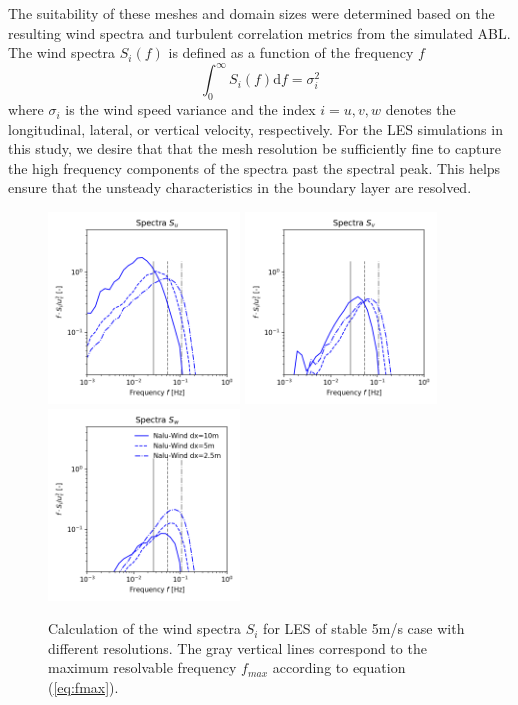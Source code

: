 The suitability of these meshes and domain sizes were determined based
on the resulting wind spectra and turbulent correlation metrics from
the simulated ABL. The wind spectra $S_i(f)$ is defined as a function
of the frequency $f$
\begin{equation}
  \int_0^\infty S_i(f) \textrm{d}f = \sigma_i^2
\end{equation}
where $\sigma_i$ is the wind speed variance and the index $i=u,v,w$
denotes the longitudinal, lateral, or vertical velocity, respectively.
For the LES simulations in this study, we desire that that the mesh
resolution be sufficiently fine to capture the high frequency
components of the spectra past the spectral peak.  This helps ensure
that the unsteady characteristics in the boundary layer are resolved.


\begin{figure}%
  \centering
  \includegraphics[width=2.0in]{figures/GridStudy_Spectra_Su.png}
  \includegraphics[width=2.0in]{figures/GridStudy_Spectra_Sv.png}
  \includegraphics[width=2.0in]{figures/GridStudy_Spectra_Sw.png}
  \caption{   \label{fig:GridStudySpectra}
    Calculation of the wind spectra $S_i$ for LES of stable
    5m/s case with different resolutions.  The gray vertical lines
    correspond to the maximum resolvable frequency $f_{max}$ according
    to equation (\ref{eq:fmax}). }
\end{figure}


